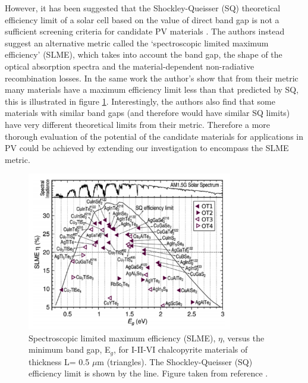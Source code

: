 However, it has been suggested that the Shockley-Queisser (SQ) theoretical efficiency limit of a solar cell based on the value of direct band gap is not a sufficient screening criteria for candidate PV materials \cite{SLME}. The authors instead suggest an alternative metric called the `spectroscopic limited maximum efficiency' (SLME), which takes into account the band gap, the shape of the optical absorption spectra and the material-dependent non-radiative recombination losses. In the same work the author's show that from their metric many materials have a maximum efficiency limit less than that predicted by SQ, this is illustrated in figure \ref{SLME}. Interestingly, the authors also find that some materials with similar band gaps (and therefore would have similar SQ limits) have very different theoretical limits from their metric. Therefore a more thorough evaluation of the potential of the candidate materials for applications in PV could be achieved by extending our investigation to encompass the SLME metric.

\begin{figure}[h!]
  \centering
    \includegraphics[width=0.8\textwidth]{figures/SLME.png}
    \caption{Spectroscopic limited maximum efficiency (SLME), $\eta$, versus the minimum band gap, E$_g$, for I-II-VI chalcopyrite materials of thickness L= 0.5 $\mu$m (triangles). The Shockley-Queisser (SQ) efficiency limit is shown by the line. Figure taken from reference .}
  \label{SLME}
\end{figure}



